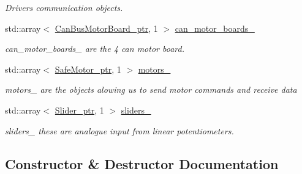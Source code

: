 \begin{DoxyCompactItemize}
\begin{DoxyCompactList}\small\item\em Drivers communication objects. \end{DoxyCompactList}\item 
\mbox{\label{classblmc__robots_1_1SingleMotor_a435394184e8e7325055685177fcf136d}} 
std\+::array$<$ \hyperlink{common__header_8hpp_aab1c6ddb1273247a1b45d5e8b417c216}{Can\+Bus\+Motor\+Board\+\_\+ptr}, 1 $>$ \hyperlink{classblmc__robots_1_1SingleMotor_a435394184e8e7325055685177fcf136d}{can\+\_\+motor\+\_\+boards\+\_\+}
\begin{DoxyCompactList}\small\item\em can\+\_\+motor\+\_\+boards\+\_\+ are the 4 can motor board. \end{DoxyCompactList}\item 
\mbox{\label{classblmc__robots_1_1SingleMotor_a0ea5ac9826c4a4cf31a422a904d45431}} 
std\+::array$<$ \hyperlink{common__header_8hpp_a9850cf917156e20846aef3f8195aea0f}{Safe\+Motor\+\_\+ptr}, 1 $>$ \hyperlink{classblmc__robots_1_1SingleMotor_a0ea5ac9826c4a4cf31a422a904d45431}{motors\+\_\+}
\begin{DoxyCompactList}\small\item\em motors\+\_\+ are the objects alowing us to send motor commands and receive data \end{DoxyCompactList}\item 
\mbox{\label{classblmc__robots_1_1SingleMotor_ae0f47f4ffeba39ecf870f1b2b9116503}} 
std\+::array$<$ \hyperlink{common__header_8hpp_a4cb9a95e8b2c0bf237ce29f5252c7b73}{Slider\+\_\+ptr}, 1 $>$ \hyperlink{classblmc__robots_1_1SingleMotor_ae0f47f4ffeba39ecf870f1b2b9116503}{sliders\+\_\+}
\begin{DoxyCompactList}\small\item\em sliders\+\_\+ these are analogue input from linear potentiometers. \end{DoxyCompactList}\end{DoxyCompactItemize}


\subsection{Constructor \& Destructor Documentation}
\mbox{\label{classblmc__robots_1_1SingleMotor_a074ba2d9a982316a4aecac65b7c1b581}} 
